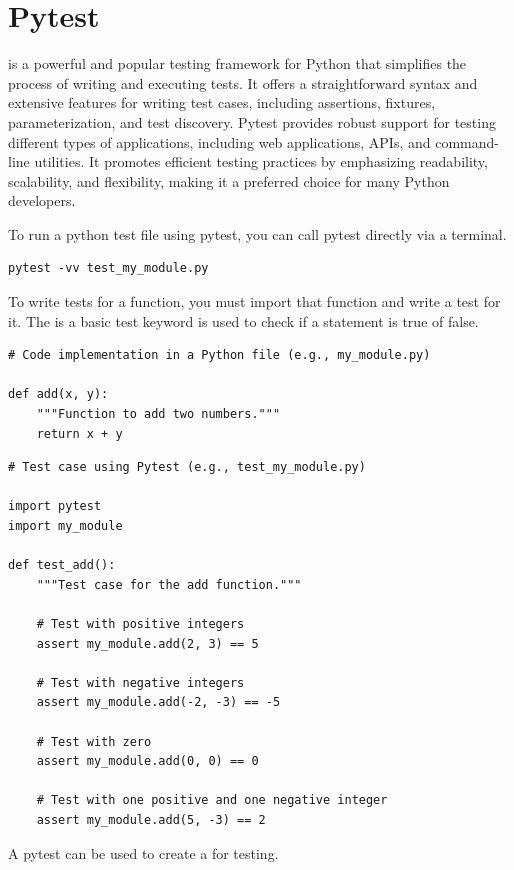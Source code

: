 \section{Pytest }

 is a powerful and popular testing framework for Python that simplifies the process of writing and executing tests. It offers a straightforward syntax and extensive features for writing test cases, including assertions, fixtures, parameterization, and test discovery. Pytest provides robust support for testing different types of applications, including web applications, APIs, and command-line utilities. It promotes efficient testing practices by emphasizing readability, scalability, and flexibility, making it a preferred choice for many Python developers.

\myindent To run a python test file using pytest, you can call pytest directly via a terminal.
\begin{lstlisting}
pytest -vv test_my_module.py
\end{lstlisting}

To write tests for a function, you must import that function and write a test for it. The  is a basic test keyword is used to check if a statement is true of false.
\begin{lstlisting}
# Code implementation in a Python file (e.g., my_module.py)

def add(x, y):
    """Function to add two numbers."""
    return x + y
\end{lstlisting}

\begin{lstlisting}
# Test case using Pytest (e.g., test_my_module.py)

import pytest
import my_module

def test_add():
    """Test case for the add function."""

    # Test with positive integers
    assert my_module.add(2, 3) == 5
    
    # Test with negative integers
    assert my_module.add(-2, -3) == -5
    
    # Test with zero
    assert my_module.add(0, 0) == 0
    
    # Test with one positive and one negative integer
    assert my_module.add(5, -3) == 2
\end{lstlisting}

A pytest  can be used to create a  for testing.

